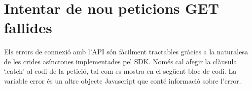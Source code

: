 \section{Intentar de nou peticions GET fallides}

    \paragraph{}
    Els errors de connexió amb l’API són fàcilment tractables gràcies a la naturalesa de les crides asíncrones implementades pel SDK. Només cal afegir la clàusula `.catch' al codi de la petició, tal com es mostra en el següent bloc de codi. La variable error és un altre objecte Javascript que conté informació sobre l’error.
